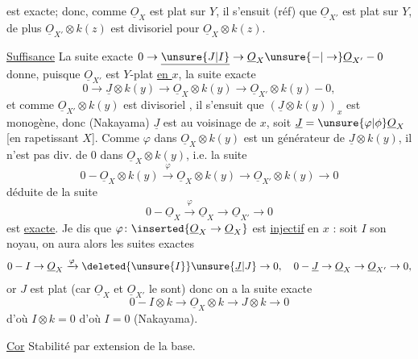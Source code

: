 est exacte; donc, comme $\underline{O}_X$ est plat sur $Y$, il s'ensuit (réf) que $\underline{O}_{X'}$ est plat sur $Y$, de plus $\underline{O}_{X'}\otimes k(z)$ est  divisoriel pour $\underline{O}_X\otimes k(z)$. 

\uline{Suffisance} La suite exacte $0\to\underline{\unsure{J|I}}\to\underline{O}_X\unsure{-|\to}\underline{O}_{X'}-0$ donne, puisque $\underline{O}_{X'}$ est $Y$-plat \uline{en $x$}, la suite exacte
\[
0\to\underline{J}\otimes k(y)\to\underline{O}_X\otimes k(y)\to\underline{O}_{X'}\otimes k(y)-0,
\]
et comme $\underline{O}_{X'}\otimes k(y)$ est divisoriel , il s'ensuit que $(\underline{J}\otimes k(y))_x$ est monogène, donc (Nakayama) $\underline{J}$  est   au voisinage de $x$, soit $\underline{J}=\unsure{\varphi|\phi}\underline{O}_X$ [en rapetissant $X$]. Comme $\varphi$ dans $\underline{O}_X\otimes k(y)$ est un générateur de $\underline{J}\otimes k(y)$, il n'est pas div. de $0$ dans $\underline{O}_X\otimes k(y)$, i.e. la suite
\[
0-\underline{O}_X\otimes k(y)\xrightarrow{\varphi}\underline{O}_X\otimes k(y)\to\underline{O}_{X'}\otimes k(y)\to0
\]
déduite de la suite
\[
0-\underline{O}_X\xrightarrow{\varphi}\underline{O}_X\to\underline{O}_{X'}\to0
\]
est \uline{exacte}. Je dis que $\varphi\colon\inserted{\underline{O}_X\to\underline{O}_X}$ est \uline{injectif} en $x$ : soit $I$ son noyau, on aura alors les suites exactes
\[
0-I\to\underline{O}_X\xrightarrow{\varphi}\deleted{\unsure{I}}\unsure{\underline{J}|J}\to0,\quad 0-\underline{J}\to\underline{O}_X\to\underline{O}_{X'}\to0,
\]
or $J$ est plat (car $\underline{O}_X$ et $\underline{O}_{X'}$ le sont) donc on a la suite exacte
\[
0-I\otimes k\to\underline{O}_X\otimes k\to J\otimes k\to0
\]
d'où $I\otimes k=0$ d'où $I=0$ (Nakayama). 

\uline{Cor} Stabilité par extension de la base.
